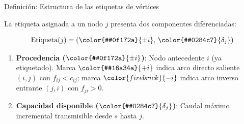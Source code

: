 \documentclass[
  ignorenonframetext,
]{beamer}
\providecommand{\tightlist}{%
  \setlength{\itemsep}{0pt}\setlength{\parskip}{0pt}}
\begin{document}
\begin{frame}{Definición: Estructura de las etiquetas de vértices}
\label{definiciuxf3n-estructura-de-las-etiquetas-de-vuxe9rtices}
\begin{tcolorbox}[enhanced jigsaw, opacityback=0, breakable, title=\textcolor{quarto-callout-note-color}{\faInfo}\hspace{0.5em}{Estructura de las etiquetas de vértices}, colback=white, colbacktitle=quarto-callout-note-color!10!white, bottomrule=.15mm, opacitybacktitle=0.6, coltitle=black, bottomtitle=1mm, leftrule=.75mm, colframe=quarto-callout-note-color-frame, toptitle=1mm, titlerule=0mm, rightrule=.15mm, left=2mm, arc=.35mm, toprule=.15mm]

La etiqueta asignada a un nodo \(j\) presenta dos componentes
diferenciadas:

\[
\text{Etiqueta}(j) = (\color{#0f172a}{\pm i}, \, \color{#0284c7}{\delta_j})
\]

\begin{enumerate}
\tightlist
\item
  \textbf{Procedencia (\(\color{#0f172a}{\pm i}\))}: Nodo antecedente
  \(i\) (ya etiquetado). Marca \textbf{\(\color{#16a34a}{+i}\)} indica
  arco directo saliente \((i, j)\) con \(f_{ij} < c_{ij}\); marca
  \textbf{\(\color{firebrick}{-i}\)} indica arco inverso entrante
  \((j, i)\) con \(f_{ji} > 0\).
\item
  \textbf{Capacidad disponible (\(\color{#0284c7}{\delta_j}\))}: Caudal
  máximo incremental transmisible desde \(s\) hasta \(j\).
\end{enumerate}

\end{tcolorbox}
\end{frame}
\end{document}
